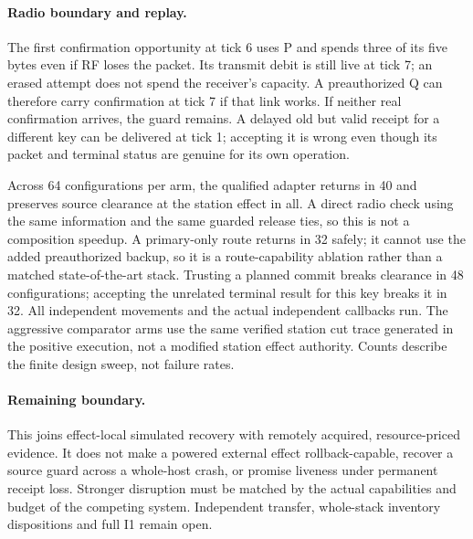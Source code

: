\documentclass{article}
\begin{document}
\paragraph{Radio boundary and replay.}
The first confirmation opportunity at tick 6 uses P and spends three
of its five bytes even if RF loses the packet. Its transmit debit is
still live at tick 7; an erased attempt does not spend the receiver's
capacity. A preauthorized Q can therefore carry confirmation at tick 7
if that link works. If neither real confirmation arrives, the guard
remains. A delayed old but valid receipt for a different key can be
delivered at tick 1; accepting it is wrong even though its packet and
terminal status are genuine for its own operation.

Across 64 configurations per arm, the qualified adapter returns in 40
and preserves source clearance at the station effect in all. A direct
radio check using the same information and the same guarded release
ties, so this is not a composition speedup. A primary-only route returns
in 32 safely; it cannot use the added preauthorized backup, so it is a
route-capability ablation rather than a matched state-of-the-art stack.
Trusting a planned commit breaks clearance in 48 configurations;
accepting the unrelated terminal result for this key breaks it in 32.
All independent movements and the actual independent callbacks run.
The aggressive comparator arms use the same verified station cut trace
generated in the positive execution, not a modified station effect
authority. Counts describe the finite design sweep, not failure rates.

\paragraph{Remaining boundary.}
This joins effect-local simulated recovery with remotely acquired,
resource-priced evidence. It does not make a powered external effect
rollback-capable, recover a source guard across a whole-host crash,
or promise liveness under permanent receipt loss. Stronger disruption
must be matched by the actual capabilities and budget of the competing
system. Independent transfer, whole-stack inventory dispositions and
full I1 remain open.
\end{document}
